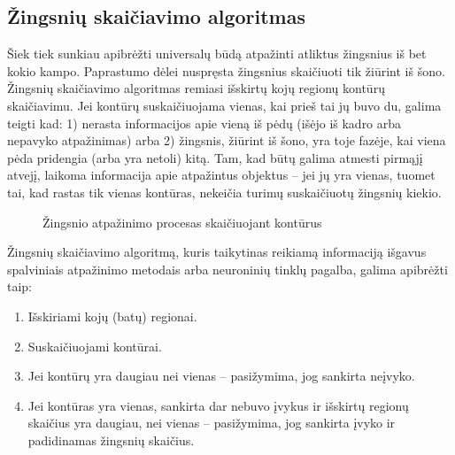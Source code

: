 \documentclass{VUMIFPSbakalaurinis}
\begin{document}
\subsection{Žingsnių skaičiavimo algoritmas}

Šiek tiek sunkiau apibrėžti universalų būdą atpažinti atliktus žingsnius iš bet kokio kampo. Paprastumo dėlei nuspręsta žingsnius skaičiuoti tik žiūrint iš šono. Žingsnių skaičiavimo algoritmas remiasi išskirtų kojų regionų kontūrų skaičiavimu. Jei kontūrų suskaičiuojama vienas, kai prieš tai jų buvo du, galima teigti kad: 1) nerasta informacijos apie vieną iš pėdų (išėjo iš kadro arba nepavyko atpažinimas) arba 2) žingsnis, žiūrint iš šono, yra toje fazėje, kai viena pėda pridengia (arba yra netoli) kitą. Tam, kad būtų galima atmesti pirmąjį atvejį, laikoma informacija apie atpažintus objektus – jei jų yra vienas, tuomet tai, kad rastas tik vienas kontūras, nekeičia turimų suskaičiuotų žingsnių kiekio. 

\begin{figure}[H]
	\centering
	\qquad
	\qquad
	\caption{Žingsnio atpažinimo procesas skaičiuojant kontūrus}
	\label{fig:steps_contours}
\end{figure}


Žingsnių skaičiavimo algoritmą, kuris taikytinas reikiamą informaciją išgavus spalviniais atpažinimo metodais arba neuroninių tinklų pagalba, galima apibrėžti taip:

\begin{enumerate}
	\item Išskiriami kojų (batų) regionai.
	\item Suskaičiuojami kontūrai.
	\item Jei kontūrų yra daugiau nei vienas – pasižymima, jog sankirta neįvyko. 
	\item Jei kontūras yra vienas, sankirta dar nebuvo įvykus ir išskirtų regionų skaičius yra daugiau, nei vienas – pasižymima, jog sankirta įvyko ir padidinamas žingsnių skaičius. 
\end{enumerate}
\end{document}
